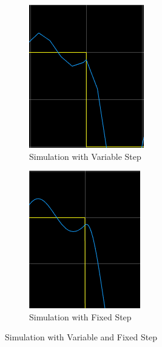 \documentclass[a4paper,12pt]{article}
\begin{document}
\begin{enumerate}
\begin{enumerate}
				\begin{figure}[H]
					\setlength{\unitlength}{\textwidth} 
					\centering
					\begin{subfigure}{.5\textwidth}
  						\centering
  						\includegraphics[width=0.48\unitlength]{images/1d22ey}
  						\caption{\label{fig:vary} Simulation with Variable Step }
					\end{subfigure}%
					\begin{subfigure}{.5\textwidth}
  						\centering
						\includegraphics[width=0.48\unitlength]{images/1f2ey}
  						\caption{\label{fig:fixed} Simulation with Fixed Step}
					\end{subfigure}
					\caption{\label{fig:varyfixed} Simulation with Variable and Fixed Step   }
				\end{figure}
				
		\end{enumerate}\-\\
	

\end{enumerate}
\end{document}
